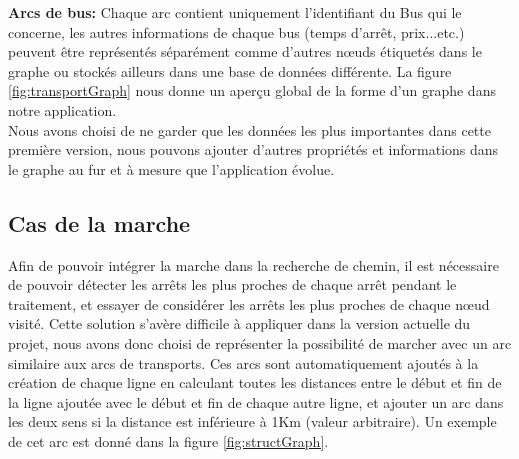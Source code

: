 \textbf{Arcs de bus: } Chaque arc contient uniquement l'identifiant du Bus qui le concerne, les autres informations de chaque bus (temps d'arrêt, prix...etc.) peuvent être représentés séparément comme d'autres nœuds étiquetés dans le graphe ou stockés ailleurs dans une base de données différente. \newline
La figure \ref{fig:transportGraph} nous donne un aperçu global de la forme d'un graphe dans notre application.\\
Nous avons choisi de ne garder que les données les plus importantes dans cette première version, nous pouvons ajouter d'autres propriétés et informations dans le graphe au fur et à mesure que l'application évolue.

%

\subsection{Cas de la marche}
Afin de pouvoir intégrer la marche dans la recherche de chemin, il est nécessaire de pouvoir détecter les arrêts les plus proches de chaque arrêt pendant le traitement, et essayer de considérer les arrêts les plus proches de chaque nœud visité.\newline 
Cette solution s'avère difficile à appliquer dans la version actuelle du projet, nous avons donc choisi de représenter la possibilité de marcher avec un arc similaire aux arcs de transports.\newline
Ces arcs sont automatiquement ajoutés à la création de chaque ligne en calculant toutes les distances entre le début et fin de la ligne ajoutée avec le début et fin de chaque autre ligne, et ajouter un arc dans les deux sens si la distance est inférieure à 1Km (valeur arbitraire).
Un exemple de cet arc est donné dans la figure \ref{fig:structGraph}.

